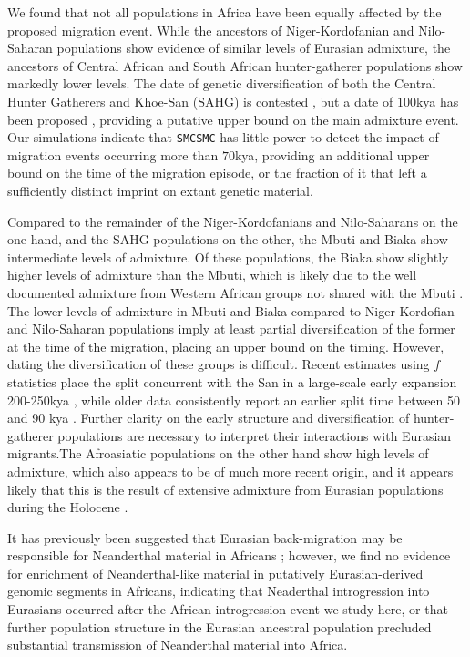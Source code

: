 \documentclass{article}
\begin{document}
We found that not all populations in Africa have been equally affected by the proposed migration event. While the ancestors of Niger-Kordofanian and Nilo-Saharan populations show evidence of similar levels of Eurasian admixture, the ancestors of Central African and South African hunter-gatherer populations show markedly lower levels.  The date of genetic diversification of both the Central Hunter Gatherers and Khoe-San (SAHG) is contested \cite{Lipson2019}, but a date of $100$kya has been proposed \cite{Schlebusch2012}, providing a putative upper bound on the main admixture event.  Our simulations indicate that {\tt SMCSMC} has little power to detect the impact of migration events occurring more than $70$kya, providing an additional upper bound on the time of the migration episode, or the fraction of it that left a sufficiently distinct imprint on extant genetic material.

Compared to the remainder of the Niger-Kordofanians and Nilo-Saharans on the one hand, and the SAHG populations on the other, the Mbuti and Biaka show intermediate levels of admixture. Of these populations, the Biaka show slightly higher levels of admixture than the Mbuti, which is likely due to the well documented admixture from Western African groups not shared with the Mbuti \cite{Batini2011}. The lower levels of admixture in Mbuti and Biaka compared to Niger-Kordofian and Nilo-Saharan populations imply at least partial diversification of the former at the time of the migration, placing an upper bound on the timing. However, dating the diversification of these groups is difficult. Recent estimates using $f$ statistics place the split concurrent with the San in a large-scale early expansion 200-250kya \cite{Lipson2019}, while older data consistently report an earlier split time between 50 and 90 kya \cite{Patin2018}. Further clarity on the early structure and diversification of hunter-gatherer populations are necessary to interpret their interactions with Eurasian migrants.The  Afroasiatic populations on the other hand show high levels of admixture, which also appears to be of much more recent origin, and it appears likely that this is the result of extensive admixture from Eurasian populations during the Holocene \cite{Busby2016, Fan2019}. 

It has previously been suggested that Eurasian back-migration may be responsible for Neanderthal material in Africans \cite{Chen2020}; however, we find no evidence for enrichment of Neanderthal-like material in putatively Eurasian-derived genomic segments in Africans, indicating that Neaderthal introgression into Eurasians occurred after the African introgression event we study here, or that further population structure in the Eurasian ancestral population precluded substantial transmission of Neanderthal material into Africa.
\end{document}

